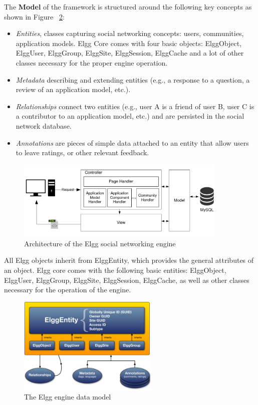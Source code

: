 The {\bf Model} of the framework is structured around the following key concepts as shown in Figure ~\ref{fig:elgg_entities}:
\begin{itemize}
\item \emph{Entities}, classes capturing social networking concepts: users, communities, application models. Elgg Core comes with four basic objects: ElggObject, ElggUser, ElggGroup, ElggSite, ElggSession, ElggCache and a lot of other classes necessary for the proper engine operation.
\item \emph{Metadata} describing and extending entities (e.g., a response to a question, a review of an application model, etc.).
\item  \emph{Relationships} connect two entities (e.g., user A is a friend of user B, user C is a contributor to an application model, etc.) and are persisted in the social network database.
\item \emph{Annotations} are pieces of simple data attached to an entity that allow users to leave ratings, or other relevant feedback.
\end{itemize}

\begin{figure}[h]
	\centering
	\includegraphics[width=0.9\textwidth,natwidth=200,natheight=150]{./fig/elgg_architecture.pdf}
	\caption{Architecture of the Elgg social networking engine}
	\label{fig:elgg_architecture}
\end{figure}

All Elgg objects inherit from ElggEntity, which provides the general attributes of an object. Elgg core comes with the following basic entities: ElggObject, ElggUser, ElggGroup, ElggSite, ElggSession, ElggCache, as well as other classes necessary for the operation of the engine.

\begin{figure}[h]
	\centering
	\includegraphics[width=0.6\textwidth,natwidth=200,natheight=150]{./fig/elgg_data_model.png}
	\caption{The Elgg engine data model}
	\label{fig:elgg_entities}
\end{figure}

